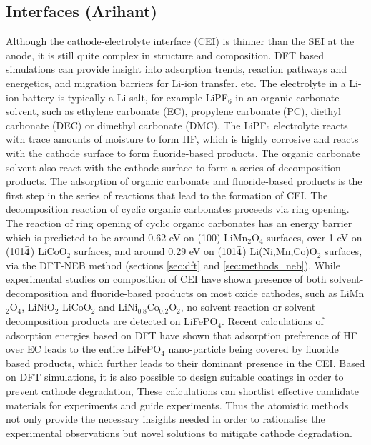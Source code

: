 \documentclass[../main.tex]{subfiles}
\begin{document}
\subsection{Interfaces (Arihant)}
\label{sec:cathode_interfaces}
Although the cathode-electrolyte interface (CEI) is thinner than the SEI at the anode, it is still quite complex in structure and composition.\cite{Gauthier2015, Edstrom2004} DFT based simulations can provide insight into adsorption trends,\cite{Bhandari2020} reaction pathways and energetics,\cite{Tebbe2015a, Tebbe2015b} and migration barriers for Li-ion transfer.\cite{Bhandari2019} etc. The electrolyte in a Li-ion battery is typically a Li salt, for example LiPF$_6$ in an organic carbonate solvent, such as ethylene carbonate (EC), propylene carbonate (PC), diethyl carbonate (DEC) or dimethyl carbonate (DMC). The LiPF$_6$ electrolyte reacts with trace amounts of moisture to form HF,\cite{Tebbe2015a} which is highly corrosive and reacts with the cathode surface to form fluoride-based products.\cite{Tebbe2015b} The organic carbonate solvent  also react with the cathode surface to form a series of decomposition products.\cite{Tebbe2016} The adsorption of organic carbonate and fluoride-based products is the first step in the series of reactions that lead to the formation of CEI. The decomposition reaction of cyclic organic carbonates proceeds via ring opening. The reaction of ring opening of cyclic organic carbonates has an energy barrier which is predicted to be around 0.62 eV on (100) LiMn$_2$O$_4$ surfaces,\cite{leung2012first} over 1 eV on (101$\Bar{4}$) LiCoO$_2$ surfaces,\cite{Tebbe2016} and around 0.29 eV on (101$\Bar{4}$) Li(Ni,Mn,Co)O$_2$ surfaces,\cite{Xu2017} via the DFT-NEB method (sections \ref{sec:dft} and \ref{sec:methods_neb}).\cite{JONSSON1998} While experimental studies on composition of CEI have shown presence of both solvent-decomposition and fluoride-based products on most oxide cathodes, such as LiMn$_2$O$_4$, LiNiO$_2$ LiCoO$_2$ and LiNi$_{0.8}$Co$_{0.2}$O$_2$, no solvent reaction or solvent decomposition products are detected on LiFePO$_4$.\cite{Edstrom2004, Malmgren2010} Recent calculations of adsorption energies based on DFT have shown that adsorption preference of HF over EC leads to the entire LiFePO$_4$ nano-particle being covered by fluoride based products, which further leads to their dominant presence in the CEI.\cite{Bhandari2020} Based on DFT simulations, it is also possible to design suitable coatings in order to prevent cathode degradation,\cite{Tebbe2015b} These calculations can shortlist effective candidate materials for experiments and guide experiments. Thus the atomistic methods not only provide the necessary insights needed in order to rationalise the experimental observations but novel solutions to mitigate cathode degradation.
\end{document}
